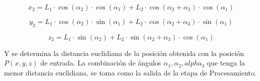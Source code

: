 \begin{equation}
	x_2 = L_1 \cdot \cos(\alpha_2) \cdot \cos(\alpha_1) + L_2 \cdot \cos(\alpha_2 + \alpha_3) \cdot \cos(\alpha_1)
\end{equation}
	
\begin{equation}
	y_2 = L_1 \cdot \cos(\alpha_2) \cdot \sin(\alpha_1) + L_2 \cdot \cos(\alpha_2 + \alpha_3) \cdot \sin(\alpha_1)
\end{equation}
	
\begin{equation}
	z_2 = L_1 \cdot \sin(\alpha_2) + L_2 \cdot \sin(\alpha_2 + \alpha_3) \cdot \cos(\alpha_1)
\end{equation}

Y se determina la distancia euclidiana de la posición obtenida con la posición $P(x,y,z)$ de entrada. La combinación de ángulos $\alpha_1, \alpha_2, alpha_3$ que tenga la menor distancia euclidiana, se toma como la salida de la etapa de Procesamiento.